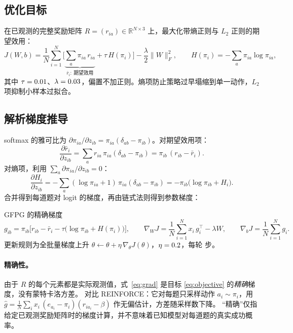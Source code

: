 \documentclass[a4paper,zihao=5,linespread=1.38]{ctexart}
\newcommand{\R}{\mathbb{R}}
\begin{document}
\subsection{优化目标}
在已观测的完整奖励矩阵 $R=(r_{ia})\in\R^{N\times3}$ 上，最大化带熵正则与 $L_2$ 正则的期望效用：
\begin{equation}\label{eq:objective}
  J(W,b)=\frac1N\sum_{i=1}^{N}\Big[\underbrace{\sum_{a}\pi_{ia}\,r_{ia}}_{\bar r_i:\ \text{期望效用}}
  +\tau\,H(\pi_i)\Big]-\frac{\lambda}{2}\lVert W\rVert_F^2,\qquad
  H(\pi_i)=-\sum_a\pi_{ia}\log\pi_{ia},
\end{equation}
其中 $\tau=0.01$、$\lambda=0.03$，偏置不加正则。熵项防止策略过早塌缩到单一动作，$L_2$ 项抑制小样本过拟合。

\subsection{解析梯度推导}
softmax 的雅可比为 $\partial\pi_{ia}/\partial z_{ib}=\pi_{ia}(\delta_{ab}-\pi_{ib})$。对期望效用项：
\begin{equation*}
  \frac{\partial \bar r_i}{\partial z_{ib}}=\sum_a r_{ia}\,\pi_{ia}(\delta_{ab}-\pi_{ib})=\pi_{ib}\,(r_{ib}-\bar r_i).
\end{equation*}
对熵项，利用 $\sum_a\partial\pi_{ia}/\partial z_{ib}=0$：
\begin{equation*}
  \frac{\partial H_i}{\partial z_{ib}}=-\sum_a(\log\pi_{ia}+1)\,\pi_{ia}(\delta_{ab}-\pi_{ib})
  =-\pi_{ib}\big(\log\pi_{ib}+H_i\big).
\end{equation*}
合并得到每道题对 logit 的梯度，再由链式法则得到参数梯度：
\begin{defbox}{GFPG 的精确梯度}
\begin{equation}\label{eq:grad}
  g_{ib}=\pi_{ib}\Big[r_{ib}-\bar r_i-\tau\big(\log\pi_{ib}+H(\pi_i)\big)\Big],\qquad
  \nabla_W J=\frac1N\sum_{i=1}^N x_i\,g_i^{\top}-\lambda W,\qquad
  \nabla_b J=\frac1N\sum_{i=1}^N g_i .
\end{equation}
更新规则为全批量梯度上升 $\theta\leftarrow\theta+\eta\,\nabla_\theta J(\theta)$，$\eta=0.2$，每轮 \numSteps{} 步。
\end{defbox}

\paragraph{精确性。}由于 $R$ 的每个元素都是实际观测值，式~\eqref{eq:grad} 是目标 \eqref{eq:objective} 的\emph{精确}梯度，没有蒙特卡洛方差。
对比 REINFORCE\cite{williams1992,sutton2000}：它对每题只采样动作 $a_i\sim\pi_i$，用
$\hat g=\frac1N\sum_i x_i\,(e_{a_i}-\pi_i)(r_{i a_i}-\beta)$ 作无偏估计，方差随采样数下降。
“精确”仅指给定已观测奖励矩阵时的梯度计算，并不意味着已知模型对每道题的真实成功概率。
\end{document}
